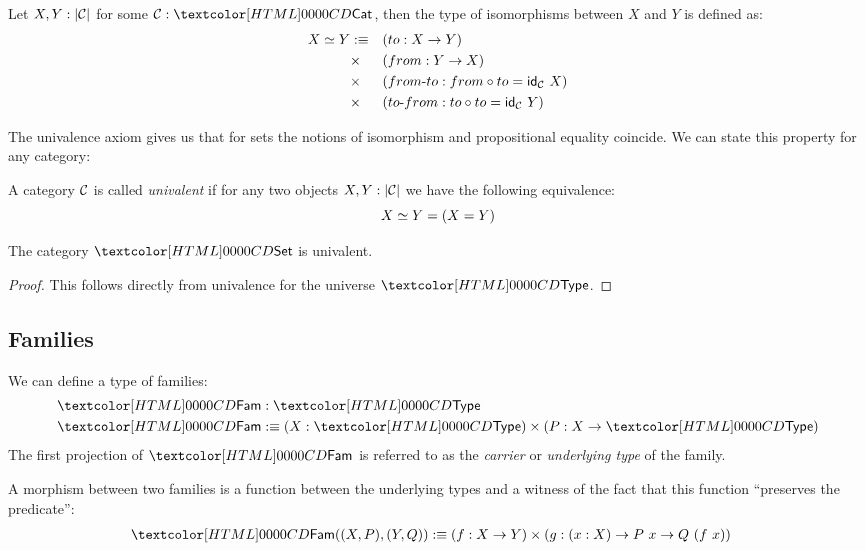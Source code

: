 \begin{definition}[Isomorphism]
  Let $X, Y : | \mathcal{C} |$ for some $\Cc : \Cat$, then the type of
  isomorphisms between $X$ and $Y$ is defined as:
  \begin{align*}
    \Iso{X}{Y} &\ddefeq &&(to : X \to Y) \\
               &\times &&(from : Y \to X) \\
               &\times &&(\identalt{from-to} : from \circ to = \id_{\Cc}\ X) \\
               &\times &&(\identalt{to-from} : to \circ to = \id_{\Cc}\ Y)
  \end{align*}
\end{definition}

The univalence axiom gives us that for sets the notions of isomorphism
and propositional equality coincide. We can state this property for
any category:

\begin{definition}
  A category $\mathcal{C}$ is called \emph{univalent} if for any two objects
  $X, Y : | \mathcal{C} |$ we have the following equivalence:
  $$
  X \simeq Y = (X = Y)
  $$  
\end{definition}

\begin{proposition}
  The category $\Set$ is univalent.
\end{proposition}

\begin{proof}
  This follows directly from univalence for the universe $\Type$.
\end{proof}

\subsection{Families}

We can define a type of families:
\begin{align*}
  &\Fam : \Type \\
  &\Fam \ddefeq (X : \Type) \times (P : X \to \Type)
\end{align*}
The first projection of $\Fam$ is referred to as the \emph{carrier} or
\emph{underlying type} of the family.

A morphism between two families is a function between the underlying
types and a witness of the fact that this function ``preserves the
predicate'':
\begin{align*}
  &\Fam((X,P),(Y,Q)) \ddefeq (f : X \to Y) \times (g : (x : X) \to P\ x \to Q\ (f\ x))
\end{align*}

